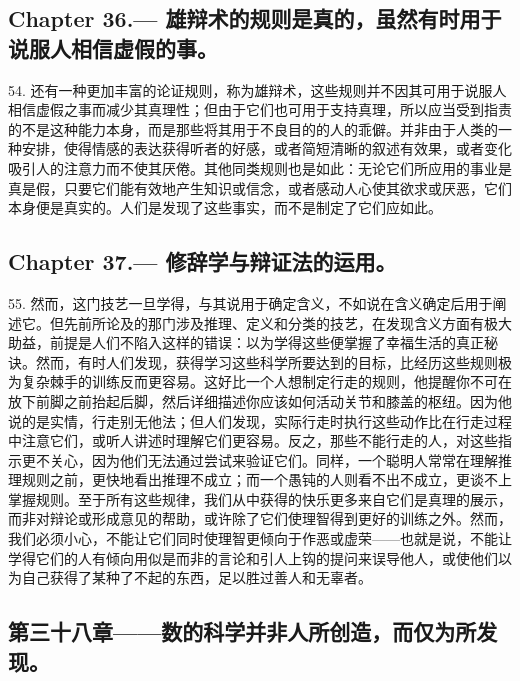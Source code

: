 \subsection{Chapter 36.— 雄辩术的规则是真的，虽然有时用于说服人相信虚假的事。}

54. 还有一种更加丰富的论证规则，称为雄辩术，这些规则并不因其可用于说服人相信虚假之事而减少其真理性；但由于它们也可用于支持真理，所以应当受到指责的不是这种能力本身，而是那些将其用于不良目的的人的乖僻。并非由于人类的一种安排，使得情感的表达获得听者的好感，或者简短清晰的叙述有效果，或者变化吸引人的注意力而不使其厌倦。其他同类规则也是如此：无论它们所应用的事业是真是假，只要它们能有效地产生知识或信念，或者感动人心使其欲求或厌恶，它们本身便是真实的。人们是发现了这些事实，而不是制定了它们应如此。\par


\subsection{Chapter 37.— 修辞学与辩证法的运用。}

55. 然而，这门技艺一旦学得，与其说用于确定含义，不如说在含义确定后用于阐述它。但先前所论及的那门涉及推理、定义和分类的技艺，在发现含义方面有极大助益，前提是人们不陷入这样的错误：以为学得这些便掌握了幸福生活的真正秘诀。然而，有时人们发现，获得学习这些科学所要达到的目标，比经历这些规则极为复杂棘手的训练反而更容易。这好比一个人想制定行走的规则，他提醒你不可在放下前脚之前抬起后脚，然后详细描述你应该如何活动关节和膝盖的枢纽。因为他说的是实情，行走别无他法；但人们发现，实际行走时执行这些动作比在行走过程中注意它们，或听人讲述时理解它们更容易。反之，那些不能行走的人，对这些指示更不关心，因为他们无法通过尝试来验证它们。同样，一个聪明人常常在理解推理规则之前，更快地看出推理不成立；而一个愚钝的人则看不出不成立，更谈不上掌握规则。至于所有这些规律，我们从中获得的快乐更多来自它们是真理的展示，而非对辩论或形成意见的帮助，或许除了它们使理智得到更好的训练之外。然而，我们必须小心，不能让它们同时使理智更倾向于作恶或虚荣——也就是说，不能让学得它们的人有倾向用似是而非的言论和引人上钩的提问来误导他人，或使他们以为自己获得了某种了不起的东西，足以胜过善人和无辜者。\par


\subsection{第三十八章——数的科学并非人所创造，而仅为所发现。}

